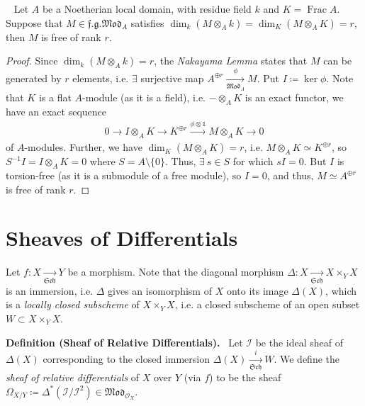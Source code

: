\documentclass[11pt,a4paper,footinclude=true,headinclude=true]{scrbook} %
\DeclareMathOperator{\Frac}{Frac}
\newcommand{\II}{\mathscr{I}}
\newcommand{\OO}{\mathcal{O}}
\newcommand{\Sch}{\mathfrak{Sch}}
\newcommand{\<}{\langle}
\newcommand{\>}{\rangle}
\newcommand{\fg}{\mathfrak{f.g.}}
\newcommand{\MOD}{\mathfrak{Mod}}
\newenvironment{lemma}[2][]
{\renewcommand\theinnercustomlemma{#2}\innercustomlemma[#1]
\begin{mdframed}[backgroundcolor=gray!20]\ }
{\end{mdframed}\endinnercustomprop}
\newenvironment{definition}[2][Definition]
    { \begin{mdframed}[backgroundcolor=gray!20] \textbf{#1 #2.}\ }
    {  \end{mdframed}}
\begin{document}
\begin{lemma}{8.9}
    Let $A$ be a Noetherian local domain, with residue field $k$ and $K=\Frac A$. Suppose that $M\in\fg\MOD_A$ satisfies $\dim_k(M\otimes_Ak)=\dim_K(M\otimes_AK)=r$, then $M$ is free of rank $r$.
\end{lemma}
\begin{proof}
    Since $\dim_k(M\otimes_Ak)=r$, the \textit{Nakayama Lemma} states that $M$ can be generated by $r$ elements, i.e. $\exists$ surjective map $A^{\oplus r}\xrightarrow[\MOD_A]{\phi}M$. Put $I\coloneqq\ker\phi$. Note that $K$ is a flat $A$-module (as it is a field), i.e. $-\otimes_AK$ is an exact functor, we have an exact sequence
    \begin{align*}
        0\longrightarrow I\otimes_AK\longrightarrow K^{\oplus r}\xrightarrow{\phi\otimes\mathds{1}}M\otimes_AK\longrightarrow0
    \end{align*}
    of $A$-modules. Further, we have $\dim_K(M\otimes_AK)=r$, i.e. $M\otimes_AK\simeq K^{\oplus r}$, so $S^{-1}I=I\otimes_AK=0$ where $S=A\setminus\{0\}$. Thus, $\exists\ s\in S$ for which $sI=0$. But $I$ is torsion-free (as it is a submodule of a free module), so $I=0$, and thus, $M\simeq A^{\oplus r}$ is free of rank $r$.
\end{proof}
\newpage
\section{Sheaves of Differentials}

Let $f:X\xrightarrow[\Sch]{}Y$ be a morphism. Note that the diagonal morphism $\Delta:X\xrightarrow[\Sch]{}X\times_YX$ is an immersion, i.e. $\Delta$ gives an isomorphism of $X$ onto its image $\Delta(X)$, which is a \textit{locally closed subscheme} of $X\times_YX$, i.e. a closed subscheme of an open subset $W\subset X\times_YX$.

\begin{definition}{(Sheaf of Relative Differentials)}
    \newline Let $\II$ be the ideal sheaf of $\Delta(X)$ corresponding to the closed immersion $\Delta(X)\xrightarrow[\Sch]{i}W$. We define the \textit{sheaf of relative differentials} of $X$ over $Y$ (via $f$) to be the sheaf $\Omega_{X/Y}\coloneqq\Delta^\ast(\II/\II^2)\in\MOD_{\OO_X}$.
\end{definition}
\end{document}
